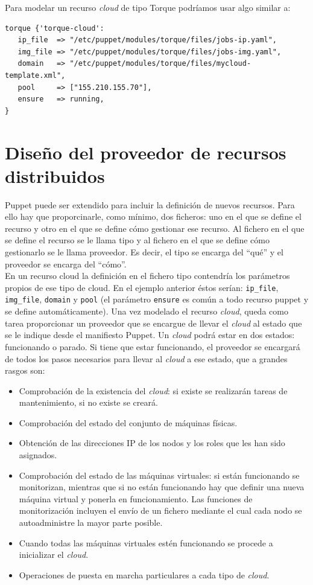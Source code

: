 Para modelar un recurso \emph{cloud} de tipo Torque podríamos usar algo similar a:

\begin{lstlisting}
torque {'torque-cloud':
   ip_file  => "/etc/puppet/modules/torque/files/jobs-ip.yaml",
   img_file => "/etc/puppet/modules/torque/files/jobs-img.yaml",
   domain   => "/etc/puppet/modules/torque/files/mycloud-template.xml",
   pool     => ["155.210.155.70"],
   ensure   => running,
}
\end{lstlisting}


\section{Diseño del proveedor de recursos distribuidos}

Puppet puede ser extendido para incluir la definición de nuevos recursos. Para ello hay que proporcinarle, como mínimo, dos ficheros: uno en el que se define el recurso y otro en el que se define cómo gestionar ese recurso. Al fichero en el que se define el recurso se le llama tipo y al fichero en el que se define cómo gestionarlo se le llama proveedor. Es decir, el tipo se encarga del ``qué'' y el proveedor se encarga del ``cómo''.\\

En un recurso cloud la definición en el fichero tipo contendría los parámetros propios de ese tipo de cloud. En el ejemplo anterior éstos serían: \texttt{ip\_file}, \texttt{img\_file}, \texttt{domain} y \texttt{pool} (el parámetro \texttt{ensure} es común a todo recurso puppet y se define automáticamente). Una vez modelado el recurso \emph{cloud}, queda como tarea proporcionar un proveedor que se encargue de llevar el \emph{cloud} al estado que se le indique desde el manifiesto Puppet. Un \emph{cloud} podrá estar en dos estados: funcionando o parado. Si tiene que estar funcionando, el proveedor se encargará de todos los pasos necesarios para llevar al \emph{cloud} a ese estado, que a grandes rasgos son:

\begin{itemize}
\item Comprobación de la existencia del \emph{cloud}: si existe se realizarán tareas de mantenimiento, si no existe se creará.
\item Comprobación del estado del conjunto de máquinas físicas.
\item Obtención de las direcciones IP de los nodos y los roles que les han sido asignados.
\item Comprobación del estado de las máquinas virtuales: si están funcionando se monitorizan, mientras que si no están funcionando hay que definir una nueva máquina virtual y ponerla en funcionamiento. Las funciones de monitorización incluyen el envío de un fichero mediante el cual cada nodo se autoadministre la mayor parte posible.
\item Cuando todas las máquinas virtuales estén funcionando se procede a inicializar el \emph{cloud}.
\item Operaciones de puesta en marcha particulares a cada tipo de \emph{cloud}.
\end{itemize}


